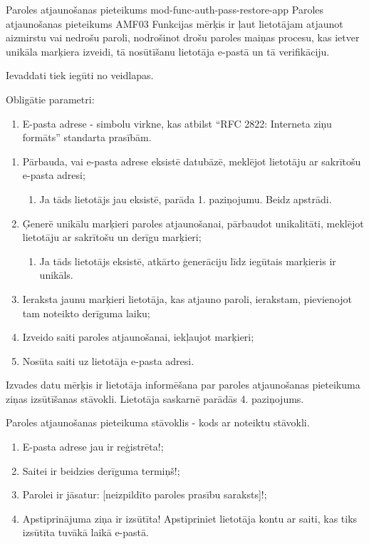 \moduleFunctionTable
{Paroles atjaunošanas pieteikums}
{mod-func-auth-pass-restore-app}
{Paroles atjaunošanas pieteikums}
{AMF03}
{
	Funkcijas mērķis ir ļaut lietotājam atjaunot aizmirstu vai nedrošu paroli, nodrošinot drošu paroles maiņas procesu, kas ietver unikāla marķiera izveidi, tā nosūtīšanu lietotāja e-pastā un tā verifikāciju.
}
{
	Ievaddati tiek iegūti no veidlapas.

	Obligātie parametri:
	\begin{enumerate}
		\item E-pasta adrese - simbolu virkne, kas atbilst “RFC 2822: Interneta ziņu formāts” standarta prasībām.
	\end{enumerate}
}
{
	\begin{enumerate}
		\item Pārbauda, vai e-pasta adrese eksistē datubāzē, meklējot lietotāju ar sakrītošu e-pasta adresi;
		      \begin{enumerate}
			      \item Ja tāds lietotājs jau eksistē, parāda 1. paziņojumu. Beidz apstrādi.
		      \end{enumerate}
		\item Ģenerē unikālu marķieri paroles atjaunošanai, pārbaudot unikalitāti, meklējot lietotāju ar sakrītošu un derīgu marķieri;
		      \begin{enumerate}
			      \item Ja tāds lietotājs eksistē, atkārto ģenerāciju līdz iegūtais marķieris ir unikāls.
		      \end{enumerate}
		\item Ieraksta jaunu marķieri lietotāja, kas atjauno paroli, ierakstam, pievienojot tam noteikto derīguma laiku;
		\item Izveido saiti paroles atjaunošanai, iekļaujot marķieri;
		\item Nosūta saiti uz lietotāja e-pasta adresi.
	\end{enumerate}
}
{
	Izvades datu mērķis ir lietotāja informēšana par paroles atjaunošanas pieteikuma ziņas izsūtīšanas stāvokli. Lietotāja saskarnē parādās 4. paziņojums.
	\begin{enumerate}
		Paroles atjaunošanas pieteikuma stāvoklis - kods ar noteiktu stāvokli.
	\end{enumerate}
}
{
	\begin{enumerate}
		\item E-pasta adrese jau ir reģistrēta!;
		\item Saitei ir beidzies derīguma termiņš!;
		\item Parolei ir jāsatur: [neizpildīto paroles prasību saraksts]!;
		\item Apstiprinājuma ziņa ir izsūtīta! Apstipriniet lietotāja kontu ar saiti, kas tiks izsūtīta tuvākā laikā e-pastā.
	\end{enumerate}
}
